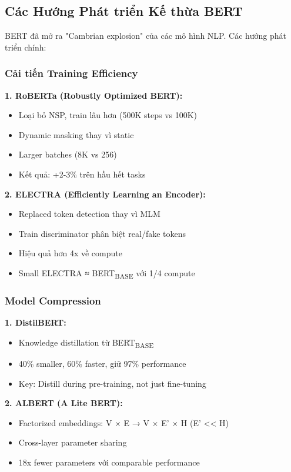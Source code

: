\subsection{Các Hướng Phát triển Kế thừa BERT}
\label{ssec:huong_phat_trien_ke_thua}
BERT đã mở ra "Cambrian explosion" của các mô hình NLP. Các hướng phát triển chính:

\subsubsection{Cải tiến Training Efficiency}

\textbf{1. RoBERTa (Robustly Optimized BERT):}
\begin{itemize}
    \item Loại bỏ NSP, train lâu hơn (500K steps vs 100K)
    \item Dynamic masking thay vì static
    \item Larger batches (8K vs 256)
    \item Kết quả: +2-3\% trên hầu hết tasks
\end{itemize}

\textbf{2. ELECTRA (Efficiently Learning an Encoder):}
\begin{itemize}
    \item Replaced token detection thay vì MLM
    \item Train discriminator phân biệt real/fake tokens
    \item Hiệu quả hơn 4x về compute
    \item Small ELECTRA ≈ BERT\textsubscript{BASE} với 1/4 compute
\end{itemize}

\subsubsection{Model Compression}

\textbf{1. DistilBERT:}
\begin{itemize}
    \item Knowledge distillation từ BERT\textsubscript{BASE}
    \item 40\% smaller, 60\% faster, giữ 97\% performance
    \item Key: Distill during pre-training, not just fine-tuning
\end{itemize}

\textbf{2. ALBERT (A Lite BERT):}
\begin{itemize}
    \item Factorized embeddings: V × E → V × E' × H (E' << H)
    \item Cross-layer parameter sharing
    \item 18x fewer parameters với comparable performance
\end{itemize}

